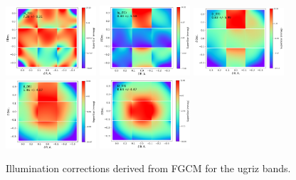 \begin{figure}
  \begin{center}
    \includegraphics[width=0.3\textwidth]{photometric_calibration_figures/illumcorr_u.png}
    \includegraphics[width=0.3\textwidth]{photometric_calibration_figures/illumcorr_g.png}
    \includegraphics[width=0.3\textwidth]{photometric_calibration_figures/illumcorr_r.png}
    \includegraphics[width=0.3\textwidth]{photometric_calibration_figures/illumcorr_i.png}
    \includegraphics[width=0.3\textwidth]{photometric_calibration_figures/illumcorr_z.png}
  \end{center}
  \caption{Illumination corrections derived from FGCM for the ugriz bands.}
  \label{fig:illumination_correction}
\end{figure}


